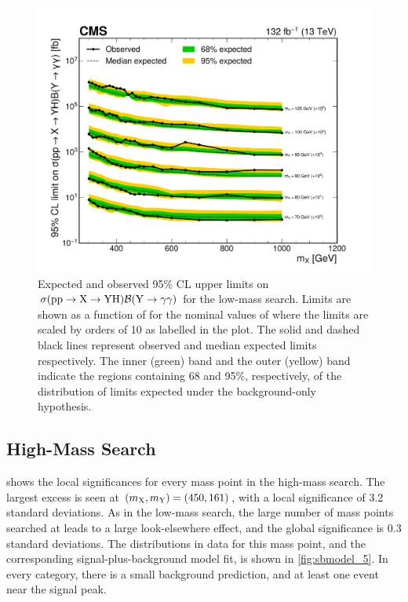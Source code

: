 \begin{figure}
    \centering
    \includegraphics[width=\textwidth]{Figures/Dihiggs/results/limits/limits_stack_my_y_gg_low_mass_paper.pdf}
    \caption[Low-Mass \XYggHtt Upper Limits in as Function of \mX in Slices of \mY]{Expected and observed 95\% CL upper limits on $\sigma(\mathrm{p}\mathrm{p} \to \mathrm{X} \to \mathrm{Y}\mathrm{H})\mathcal{B}(\mathrm{Y} \to \gamma\gamma)$ for the low-mass \XYggHtt search. Limits are shown as a function of \mX for the nominal values of \mY where the limits are scaled by orders of 10 as labelled in the plot. The solid and dashed black lines represent observed and median expected limits respectively. The inner (green) band and the outer (yellow) band indicate the regions containing 68 and 95\%, respectively, of the distribution of limits expected under the background-only hypothesis.}\label{fig:limits_stack_my_y_gg_low_mass}
\end{figure}

\subsection[High-Mass \texorpdfstring{\XYggHtt}{XY(tt)H(gg)} Search]{High-Mass \XYggHtt Search}\label{sec:results_y_gg_high_mass}

 shows the local significances for every mass point in the high-mass \XYggHtt search. The largest excess is seen at $(m_{\mathrm{X}},m_{\mathrm{Y}})=(450,161)$\GeV, with a local significance of 3.2 standard deviations. As in the low-mass \XYggHtt search, the large number of mass points searched at leads to a large look-elsewhere effect, and the global significance is 0.3 standard deviations. The \mgg distributions in data for this mass point, and the corresponding signal-plus-background model fit, is shown in \cref{fig:sbmodel_5}. In every category, there is a small background prediction, and at least one event near the signal peak.  

